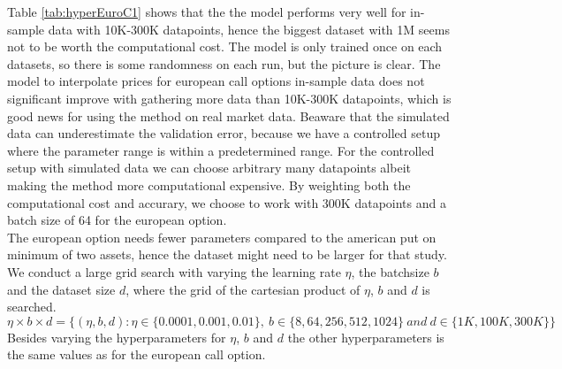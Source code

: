 Table \ref{tab:hyperEuroC1} shows that the the model performs very well for in-sample data with 10K-300K datapoints, hence the biggest dataset with 1M seems not to be worth the computational cost. The model is only trained once on each datasets, so there is some randomness on each run, but the picture is clear. The model to interpolate prices for european call options in-sample data does not significant improve with gathering more data than 10K-300K datapoints, which is good news for using the method on real market data.  Beaware that the simulated data can underestimate the validation error, because we have a controlled setup where the parameter range is within a predetermined range. For the controlled setup with simulated data we can choose arbitrary many datapoints albeit making the method more computational expensive. By weighting both the computational cost and accurary, we choose to work with 300K datapoints and a batch size of 64 for the european option. \\

The european option needs fewer parameters compared to the american put on minimum of two assets, hence the dataset might need to be larger for that study. We conduct a large grid search with varying the learning rate $\eta$, the batchsize $b$ and the dataset size $d$, where the grid of the cartesian product of $\eta$, $b$ and $d$ is searched.
$$\eta \times b \times d = \{(\eta,b, d) : \eta \in \{0.0001, 0.001, 0.01 \}, \ b \in \{8, 64, 256, 512, 1024\} \ and \ d \in\{1K,100K,300K \} \}$$
Besides varying the hyperparameters for $\eta$, $b$ and $d$ the other hyperparameters is the same values as for the european call option.\\

